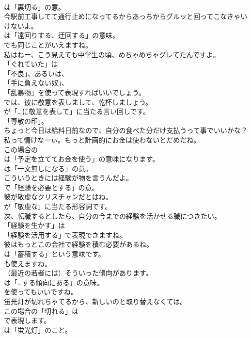 \documentclass[8pt]{extreport}
\begin{document}
\begin{CJK}{UTF8}{min}
\\	は「裏切る」の意。	
\\	今駅前工事してて通行止めになってるからあっちからグルッと回ってこなきゃいけないよ。 
\\	は「遠回りする、迂回する」の意味。
\\	でも同じことがいえますね。	
\\	私はねー、こう見えても中学生の頃、めちゃめちゃグレてたんですよ。 
\\	「ぐれていた」は 
\\	「不良」、あるいは、
\\	「手に負えない奴」、
\\	「乱暴物」を使って表現すればいいでしょう。	
\\	では、彼に敬意を表しまして、乾杯しましょう。 
\\	が「…に敬意を表して」に当たる言い回しです。
\\	「尊敬の印」。	
\\	ちょっと今日は給料日前なので、自分の食べた分だけ支払うって事でいいかな？私って情けなーぃ。もっと計画的にお金は使わないとだめだね。 
\\	この場合の
\\	は「予定を立ててお金を使う」の意味になります。
\\	は「一文無しになる」の意。	
\\	こういうときには経験が物を言うんだよ。 
\\	で「経験を必要とする」の意。	
\\	彼が敬虔なクリスチャンだとはね。 
\\	が「敬虔な」に当たる形容詞です。	
\\	次、転職するとしたら、自分の今までの経験を活かせる職につきたい。 
\\	「経験を生かす」は
\\	「経験を活用する」で表現できますね。	
\\	彼はもっとこの会社で経験を積む必要があるね。 
\\	は「蓄積する」という意味です。
\\	も使えますね。	
\\	（最近の若者には）そういった傾向があります。 
\\	は「…する傾向にある」の意味。
\\	を使ってもいいですね。	
\\	蛍光灯が切れちゃてるから、新しいのと取り替えなくては。 
\\	この場合の「切れる」は
\\	で表現します。
\\	は「蛍光灯」のこと。	

\end{CJK}
\end{document}
